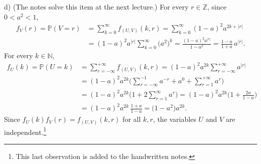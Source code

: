 \begin{example}
d) (The notes solve this item at the next lecture.) For every $r\in\mathbb Z$, since $0<a^2<1$,
\[
\begin{aligned}
  f_V(r)=\mathbb P(V=r)&=\sum_{k=0}^\infty f_{(U,V)}(k,r)=\sum_{k=0}^\infty(1-a)^2a^{2k+|r|}\\
  &=(1-a)^2a^{|r|}\sum_{k=0}^\infty\big(a^2\big)^k=\frac{(1-a)^2a^{|r|}}{1-a^2}=\frac{1-a}{1+a}\,a^{|r|}.
\end{aligned}
\]
For every $k\in\mathbb N$,
\[
\begin{aligned}
  f_U(k)=\mathbb P(U=k)&=\sum_{r=-\infty}^{+\infty}f_{(U,V)}(k,r)=(1-a)^2a^{2k}\sum_{r=-\infty}^{+\infty}a^{|r|}\\
  &=(1-a)^2a^{2k}\Big(\sum_{r=-\infty}^{-1}a^{-r}+a^0+\sum_{r=1}^{+\infty}a^r\Big)\\
  &=(1-a)^2a^{2k}\Big(1+2\sum_{r=1}^\infty a^r\Big)=(1-a)^2a^{2k}\Big(1+\frac{2a}{1-a}\Big)\\
  &=(1-a)^2a^{2k}\,\frac{1+a}{1-a}=\big(1-a^2\big)a^{2k}.
\end{aligned}
\]
Since $f_U(k)f_V(r)=f_{(U,V)}(k,r)$ for all $k,r$, the variables $U$ and $V$ are independent.\footnote{This last observation is added to the handwritten notes.}
\end{example}


